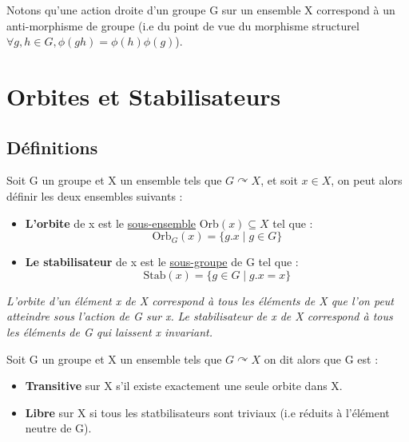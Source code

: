 \begin{remark}
	Notons qu'une action droite d'un groupe G sur un ensemble X correspond à un anti-morphisme de groupe 
	(i.e du point de vue du morphisme structurel $ \forall g,h \in G, \phi(gh) = \phi(h)\phi(g)$).
\end{remark}


\section{Orbites et Stabilisateurs}
\subsection{Définitions}

\begin{definition}
	Soit G un groupe et X un ensemble tels que $G \curvearrowright X$, et soit $x \in X$, on peut alors définir les deux ensembles suivants :
	\begin{itemize}
		\item \textbf{L'orbite} de x est le \underline{sous-ensemble} Orb$(x) \subseteq X$ tel que :
			\[ \boxed{ \text{Orb}_G(x) = \{g.x \; | \; g \in G\} } \] 
		\item \textbf{Le stabilisateur} de x est le \underline{sous-groupe} de G tel que :
			\[ \boxed{ \text{Stab}(x) = \{ g \in G \; | \; g.x = x \} }\] 
	\end{itemize}
	\emph{L'orbite d'un élément x de X correspond à tous les éléments de X que l'on peut atteindre sous l'action de G sur x.}
	\emph{Le stabilisateur de x de X correspond à tous les éléments de G qui laissent x invariant.}
\end{definition}


\begin{definition}
	Soit G un groupe et X un ensemble tels que $G \curvearrowright X$ on dit alors que G est :
	\begin{itemize}
		\item \textbf{Transitive} sur X s'il existe exactement une seule orbite dans X. 
		\item \textbf{Libre} sur X si tous les statbilisateurs sont triviaux (i.e réduits à l'élément neutre de G). 
	\end{itemize}
\end{definition}

